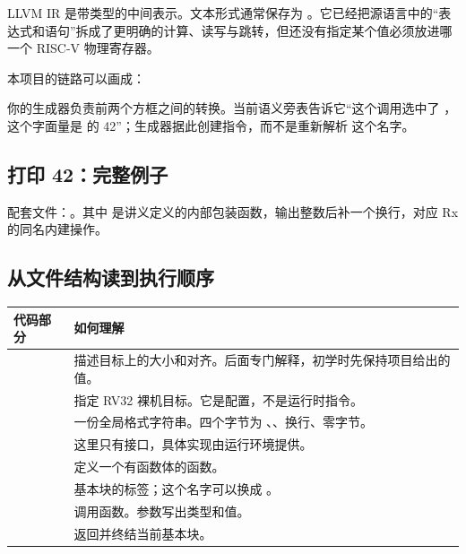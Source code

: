 
LLVM IR 是带类型的中间表示。文本形式通常保存为 。它已经把源语言中的“表达式和语句”拆成了更明确的计算、读写与跳转，但还没有指定某个值必须放进哪一个 RISC-V 物理寄存器。

本项目的链路可以画成：
\begin{center}
\end{center}

你的生成器负责前两个方框之间的转换。当前语义旁表告诉它“这个调用选中了 ，这个字面量是  的 42”；生成器据此创建指令，而不是重新解析  这个名字。

\subsection{打印 42：完整例子}
配套文件：。其中  是讲义定义的内部包装函数，输出整数后补一个换行，对应 Rx 的同名内建操作。


\subsection{从文件结构读到执行顺序}
\begin{tabularx}{\linewidth}{@{}p{42mm}Y@{}}
\toprule
代码部分 & 如何理解 \\
\midrule
{} & 描述目标上的大小和对齐。后面专门解释，初学时先保持项目给出的值。\\
 & 指定 RV32 裸机目标。它是配置，不是运行时指令。\\
 & 一份全局格式字符串。四个字节为 \code{\%}、、换行、零字节。\\
 & 这里只有接口，具体实现由运行环境提供。\\
 & 定义一个有函数体的函数。\\
 & 基本块的标签；这个名字可以换成 。\\
 & 调用函数。参数写出类型和值。\\
 & 返回并终结当前基本块。\\
\bottomrule
\end{tabularx}

